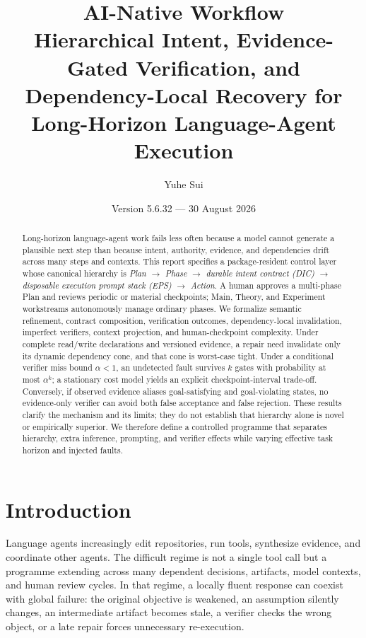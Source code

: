 \documentclass[11pt]{article}
\title{\textbf{AI-Native Workflow}\\\large Hierarchical Intent, Evidence-Gated Verification, and Dependency-Local Recovery for Long-Horizon Language-Agent Execution}
\author{Yuhe Sui}
\date{Version 5.6.32 --- 30 August 2026}
\begin{document}
\maketitle

\begin{abstract}
Long-horizon language-agent work fails less often because a model cannot generate a plausible next step than because intent, authority, evidence, and dependencies drift across many steps and contexts. This report specifies a package-resident control layer whose canonical hierarchy is \emph{Plan $\rightarrow$ Phase $\rightarrow$ durable intent contract (DIC) $\rightarrow$ disposable execution prompt stack (EPS) $\rightarrow$ Action}. A human approves a multi-phase Plan and reviews periodic or material checkpoints; Main, Theory, and Experiment workstreams autonomously manage ordinary phases. We formalize semantic refinement, contract composition, verification outcomes, dependency-local invalidation, imperfect verifiers, context projection, and human-checkpoint complexity. Under complete read/write declarations and versioned evidence, a repair need invalidate only its dynamic dependency cone, and that cone is worst-case tight. Under a conditional verifier miss bound $\alpha<1$, an undetected fault survives $k$ gates with probability at most $\alpha^k$; a stationary cost model yields an explicit checkpoint-interval trade-off. Conversely, if observed evidence aliases goal-satisfying and goal-violating states, no evidence-only verifier can avoid both false acceptance and false rejection. These results clarify the mechanism and its limits; they do not establish that hierarchy alone is novel or empirically superior. We therefore define a controlled programme that separates hierarchy, extra inference, prompting, and verifier effects while varying effective task horizon and injected faults.
\end{abstract}

\tableofcontents
\newpage

\section{Introduction}
Language agents increasingly edit repositories, run tools, synthesize evidence, and coordinate other agents. The difficult regime is not a single tool call but a programme extending across many dependent decisions, artifacts, model contexts, and human review cycles. In that regime, a locally fluent response can coexist with global failure: the original objective is weakened, an assumption silently changes, an intermediate artifact becomes stale, a verifier checks the wrong object, or a late repair forces unnecessary re-execution.
\end{document}
